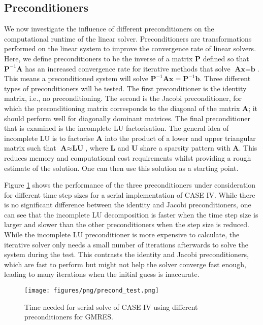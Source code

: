 \subsection{Preconditioners}
We now investigate the influence of different preconditioners on the computational runtime of the linear solver.
Preconditioners are transformations performed on the linear system to improve the convergence rate of linear solvers. Here, we define preconditioners to be the inverse of a matrix $\textbf{P}$ defined so that $\textbf{P}^{-1}\textbf{A}$ has an increased convergence rate for iterative methods that solve $\textbf{Ax} = \textbf{b}$. This means a preconditioned system will solve $\textbf{P}^{-1}\textbf{Ax} = \textbf{P}^{-1}\textbf{b}$. Three different types of preconditioners will be tested. The first preconditioner is the identity matrix, i.e., no preconditioning. The second is the Jacobi preconditioner, for which the preconditioning matrix corresponds to the diagonal of the matrix $\textbf{A}$; it should perform well for diagonally dominant matrices. The final preconditioner that is examined is the incomplete LU factorisation. The general idea of incomplete LU is to factorise $\textbf{A}$ into the product of a lower and upper triangular matrix such that $\textbf{A} \approx \textbf{LU}$, where $\textbf{L}$ and $\textbf{U}$ share a sparsity pattern with $\textbf{A}$. This reduces memory and computational cost requirements whilst providing a rough estimate of the solution. One can then use this solution as a starting point.

Figure \ref{fig: preconditioners} shows the performance of the three preconditioners under consideration for different time step sizes for a serial implementation of CASE IV. While there is no significant difference between the identity and Jacobi preconditioners, one can see that the incomplete LU decomposition is faster when the time step size is larger and slower than the other preconditioners when the step size is reduced. While the incomplete LU preconditioner is more expensive to calculate, the iterative solver only needs a small number of iterations afterwards to solve the system during the test. This contrasts the identity and Jacobi preconditioners, which are fast to perform but might not help the solver converge fast enough, leading to many iterations when the initial guess is inaccurate.
 \begin{figure}[h]
    \centering
    \texttt{[image: figures/png/precond\_test.png]}
    \caption{Time needed for serial solve of CASE IV using different preconditioners for GMRES.}
    \label{fig: preconditioners}
\end{figure}

